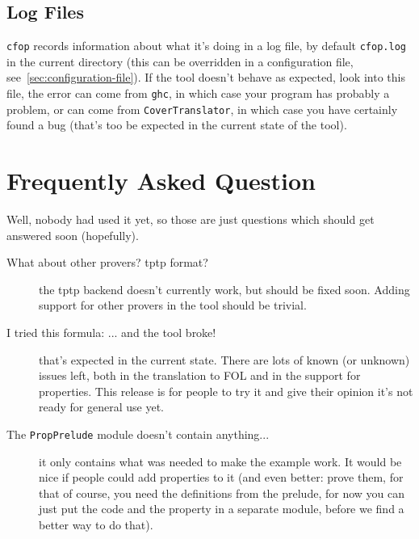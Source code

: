 \documentclass{article}
\newcommand{\cfop}{{\tt cfop}\xspace}
\begin{document}
\subsection{Log Files}
\label{sec:log-files}
\cfop records information about what it's doing in a log file, by
default {\tt cfop.log} in the current directory (this can be
overridden in a configuration file, see~\ref{sec:configuration-file}).
If the tool doesn't behave as expected, look into this file, the error
can come from {\tt ghc}, in which case your program has probably a
problem, or can come from {\tt CoverTranslator}, in which case you
have certainly found a bug (that's too be expected in the current
state of the tool).

\section{Frequently Asked Question}
Well, nobody had used it yet, so those are just questions which should
get answered soon (hopefully).

\begin{description}
\item[What about other provers? tptp format?] the tptp backend
doesn't currently work, but should be fixed soon. Adding support for
other provers in the tool should be trivial.


\item[I tried this formula: ... and the tool broke!]  that's expected
in the current state. There are lots of known (or unknown) issues
left, both in the translation to FOL and in the support for
properties. This release is for people to try it and give their
opinion it's not ready for general use yet.

\item[The {\tt PropPrelude} module doesn't contain anything...]
it only contains  what was needed to make the example work. It would be
nice if people could add properties to it (and even better: prove
them, for that of course, you need the definitions from the prelude,
for now you can just put the code and the property in a separate
module, before we find a better way to do that).
\end{description}
\end{document}
